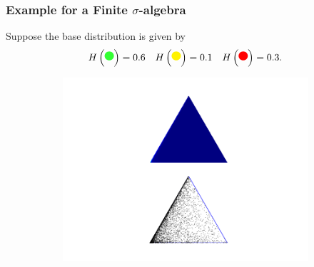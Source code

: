 \documentclass[12pt]{beamer}
\begin{document}
\begin{frame}[t]
    \frametitle{Example for a Finite $\sigma$-algebra}

    \begin{mdframed}[tikzsetting={draw=red,ultra thick}]
        Suppose the base distribution is given by
        \begin{align*}
            H \left(\tikz{\node[circle,fill=green!80,minimum width=.8ex] {};}\right)
            = 0.6
            &&
            H \left(\tikz{\node[circle,fill=yellow,minimum width=.8ex] {};}\right)
            = 0.1
            &&
            H \left(\tikz{\node[circle,fill=red,minimum width=.8ex] {};}\right)
            = 0.3.
        \end{align*}

    \end{mdframed}

    \begin{figure}[!h]
        \centering
        \begin{subfigure}[t]{0.32\textwidth}
            \centering
            \includegraphics[width=\textwidth]{images/example_dirichlet_alpha_2.png}


\end{subfigure}
\end{figure}
\end{frame}
\end{document}
